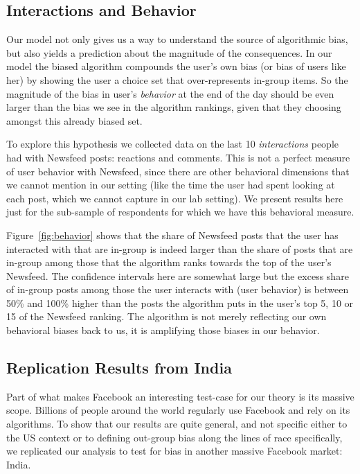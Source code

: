 \documentclass[12pt,letterpaper]{article}
\begin{document}
\subsection{Interactions and Behavior}
Our model not only gives us a way to understand the source of algorithmic bias, but also yields a prediction about the magnitude of the consequences. In our model the biased algorithm compounds the user's own bias (or bias of users like her) by showing the user a choice set that over-represents in-group items. So the magnitude of the bias in user's \emph{behavior} at the end of the day should be even larger than the bias we see in the algorithm rankings, given that they choosing amongst this already biased set. 

To explore this hypothesis we collected data on the last 10 \emph{interactions} people had with Newsfeed posts: reactions and comments. This is not a perfect measure of user behavior with Newsfeed, since there are other behavioral dimensions that we cannot mention in our setting (like the time the user had spent looking at each post, which we cannot capture in our lab setting). We present results here just for the sub-sample of respondents for which we have this behavioral measure.

Figure~\ref{fig:behavior} shows that the share of Newsfeed posts that the user has interacted with that are in-group is indeed larger than the share of posts that are in-group among those that the algorithm ranks towards the top of the user's Newsfeed. The confidence intervals here are somewhat large but the excess share of in-group posts among those the user interacts with (user behavior) is between 50\% and 100\% higher than the posts the algorithm puts in the user's top 5, 10 or 15 of the Newsfeed ranking. The algorithm is not merely reflecting our own behavioral biases back to us, it is amplifying those biases in our behavior.

\subsection{Replication Results from India}

Part of what makes Facebook an interesting test-case for our theory is its massive scope. Billions of people around the world regularly use Facebook and rely on its algorithms. To show that our results are quite general, and not specific either to the US context or to defining out-group bias along the lines of race specifically, we replicated our analysis to test for bias in another massive Facebook market: India.
\end{document}
